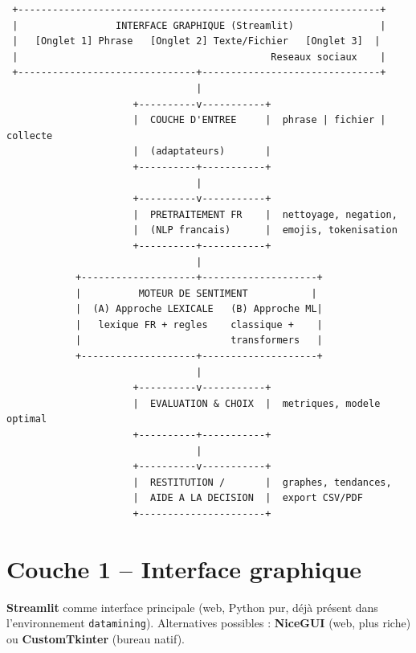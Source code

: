 \documentclass[11pt,a4paper]{article}
\newcommand{\code}[1]{\texttt{\small #1}}
\begin{document}
{\scriptsize
\begin{verbatim}
 +---------------------------------------------------------------+
 |                 INTERFACE GRAPHIQUE (Streamlit)               |
 |   [Onglet 1] Phrase   [Onglet 2] Texte/Fichier   [Onglet 3]  |
 |                                            Reseaux sociaux    |
 +-------------------------------+-------------------------------+
                                 |
                      +----------v-----------+
                      |  COUCHE D'ENTREE     |  phrase | fichier | collecte
                      |  (adaptateurs)       |
                      +----------+-----------+
                                 |
                      +----------v-----------+
                      |  PRETRAITEMENT FR    |  nettoyage, negation,
                      |  (NLP francais)      |  emojis, tokenisation
                      +----------+-----------+
                                 |
            +--------------------+--------------------+
            |          MOTEUR DE SENTIMENT           |
            |  (A) Approche LEXICALE   (B) Approche ML|
            |   lexique FR + regles    classique +    |
            |                          transformers   |
            +--------------------+--------------------+
                                 |
                      +----------v-----------+
                      |  EVALUATION & CHOIX  |  metriques, modele optimal
                      +----------+-----------+
                                 |
                      +----------v-----------+
                      |  RESTITUTION /       |  graphes, tendances,
                      |  AIDE A LA DECISION  |  export CSV/PDF
                      +----------------------+
\end{verbatim}}

\section{Couche 1 -- Interface graphique}

\begin{decision}
\textbf{Streamlit} comme interface principale (web, Python pur, déjà présent
dans l'environnement \code{datamining}). Alternatives possibles :
\textbf{NiceGUI} (web, plus riche) ou \textbf{CustomTkinter} (bureau natif).
\end{decision}
\end{document}
